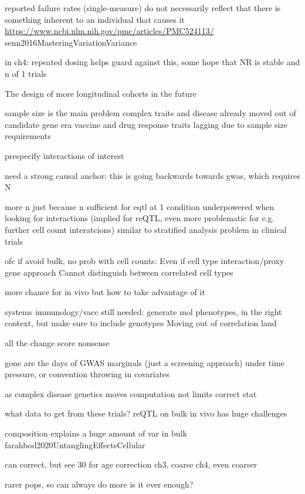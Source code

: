 \begin{outline}
        reported failure rates (single-measure) do not necessarily reflect that there is something inherent to an individual that causes it \url{https://www.ncbi.nlm.nih.gov/pmc/articles/PMC524113/} senn2016MasteringVariationVariance

            in ch4: repeated dosing helps guard against this, some hope that NR is stable
            and n of 1 trials

The design of more longitudinal cohorts in the future

    sample size is the main problem
        complex traits and disease already moved out of candidate gene era
        vaccine and drug response traits lagging due to sample size requirements

        prespecify interactions of interest

    need a strong causal anchor: this is going backwards towards gwas, which requires N

    more n
        just because n sufficient for eqtl at 1 condition
        underpowered when looking for interactions (implied for reQTL, even more problematic for e.g. further cell count interatcions)
        similar to stratified analysis problem in clinical trials

    ofc if avoid bulk, no prob with cell counts:
        Even if cell type interaction/proxy gene approach
        Cannot distinguish between correlated cell types

    more chance for in vivo
        but how to take advantage of it

    systems immunology/vacc still needed: generate mol phenotypes, in the right context,
    but make sure to include genotypes
    Moving out of correlation land

    all the change score nonsense

    gone are the days of GWAS marginals (just a screening approach)
        under time pressure, or convention
        throwing in covariates

    as     complex disease genetics moves 
    computation not limits correct stat

what data to get from these trials?
    reQTL on bulk in vivo has huge challenges

    composition explains a huge amount of var in bulk farahbod2020UntanglingEffectsCellular

    can correct, but see 30 for age correction
        ch3, coarse
        ch4, even coarser

        rarer pops, so can always do more
        is it ever enough?


\end{outline}
